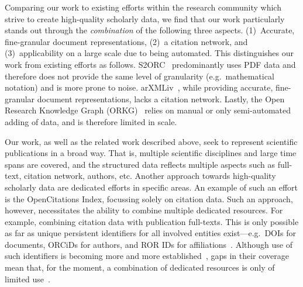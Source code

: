 Comparing our work to existing efforts within the research community which strive to create high-quality scholarly data, we find that our work particularly stands out through the \emph{combination} of the following three aspects. (1)~Accurate, fine-granular document representations, (2)~a citation network, and (3)~applicability on a large scale due to being automated. This distinguishes our work from existing efforts as follows. S2ORC~\cite{Lo2020} predominantly uses PDF data and therefore does not provide the same level of granularity (e.g.\ mathematical notation) and is more prone to noise. arXMLiv~\cite{arXMLiv}, while providing accurate, fine-granular document representations, lacks a citation network. Lastly, the Open Research Knowledge Graph (ORKG)~\cite{orkg1,orkg2} relies on manual or only semi-automated adding of data, and is therefore limited in scale.



Our work, as well as the related work described above, seek to represent scientific publications in a broad way.
That is, multiple scientific disciplines and large time spans are covered, and the structured data reflects multiple aspects such as full-text, citation network, authors, etc. Another approach towards high-quality scholarly data are dedicated efforts in specific areas. An example of such an effort is the OpenCitations Index, focussing solely on citation data. Such an approach, however, necessitates the ability to combine multiple dedicated resources. For example, combining citation data with publication full-texts. This is only possible as far as unique persistent identifiers for all involved entities exist---e.g.\ DOIs for documents, ORCiDs for authors, and ROR IDs for affiliations~\cite{Meadows2019}. Although use of such identifiers is becoming more and more established~\cite{Gorraiz2016}, 
gaps in their coverage mean that, for the moment, a combination of dedicated resources is only of limited use~\cite{Youtie2017,Haak2018}.

